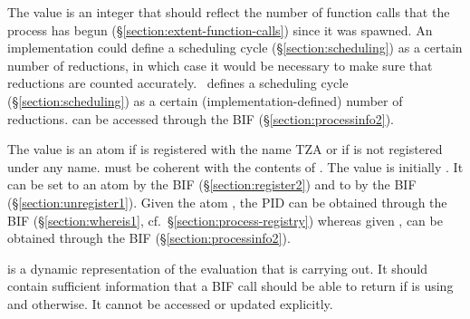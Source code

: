 \begin{Lentry}
\item[\T{reductions[\Z{P}]}]
The value is an integer that should reflect the number of function calls that the process has begun
(\S\ref{section:extent-function-calls}) since it was spawned.
\ifNew
An implementation could define a scheduling cycle (\S\ref{section:scheduling})
as a certain number of reductions, in which case
it would be necessary to make sure that reductions are counted accurately.
\fi
\ifOld
\OldErlang\ defines a scheduling cycle (\S\ref{section:scheduling})
as a certain (implementation-defined) number of reductions.
\fi
{}
can be accessed through the BIF  (\S\ref{section:processinfo2}).

\item[\T{registered_name[\Z{P}]}]
The value is an atom  if  is registered with the name TZ{A} 
or \T{[]} if  is not registered under any name.  
must be coherent with the contents of .
The value is initially \TZ{[]}.  It can be set to an atom by the BIF
 (\S\ref{section:register2})
and to \T{[]} by the BIF
 (\S\ref{section:unregister1}).  Given the atom
, the PID
 can be obtained through the BIF
 (\S\ref{section:whereis1},
cf.\ \S\ref{section:process-registry})
whereas given ,  can be obtained through the BIF
(\S\ref{section:processinfo2}).

\item[\T{stack_trace[\Z{P}]}]
 is a dynamic representation of the evaluation that 
is carrying out.
It should contain sufficient information that a BIF call
\ifOld {} \fi
\ifNew {} \fi
should be able to return  if  is using
 and  otherwise.
It cannot be accessed or updated explicitly.


\end{Lentry}
